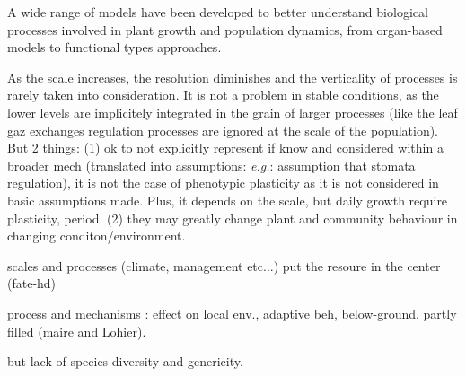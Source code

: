 A wide range of models have been developed to better understand biological processes involved in plant growth and population dynamics, from organ-based models to functional types approaches.

As the scale increases, the resolution diminishes and the verticality of processes is rarely taken into consideration. It is not a problem in stable conditions, as the lower levels are implicitely integrated in the grain of larger processes (like the leaf gaz exchanges regulation processes are ignored at the scale of the population). But 2 things:
(1) ok to not explicitly represent if know and considered within a broader mech (translated into assumptions: \textit{e.g.}: assumption that stomata regulation), it is not the case of phenotypic plasticity as it is not considered in basic assumptions made. Plus, it depends on the scale, but daily growth require plasticity, period.
(2) they may greatly change plant and community behaviour in changing conditon/environment.
 
scales and processes (climate, management etc...)
put the resoure in the center (fate-hd)

process and mechanisms
\parencite{berger_competition_2008}: effect on local env., adaptive beh, below-ground.
partly filled (maire and Lohier).

but lack of species diversity and genericity. 

